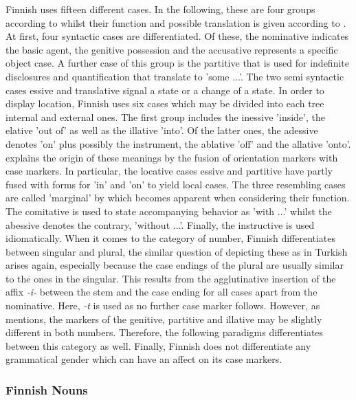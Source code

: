 \documentclass[11pt,a4paper,twoside,openright]{scrbook}
\begin{document}
Finnish uses fifteen different cases. In the following, these are four groups according to \citet{putz2002finn} whilst their function and possible translation is given according to \citet{karlsson2018finn}. At first, four syntactic cases are differentiated. Of these, the nominative indicates the basic agent, the genitive possession and the accusative represents a specific object case. A further case of this group is the partitive that is used for indefinite disclosures and quantification that translate to 'some ...'. The two semi syntactic cases essive and translative signal a state or a change of a state. In order to display location, Finnish uses six cases which may be divided into each tree internal and external ones. The first group includes the inessive 'inside', the elative 'out of' as well as the illative 'into'. Of the latter ones, the adessive denotes 'on' plus possibly the instrument, the ablative 'off' and the allative 'onto'. \citet{blake2012hbocas} explains the origin of these meanings by the fusion of orientation markers with case markers. In particular, the locative cases essive and partitive have partly fused with forms for 'in' and 'on' to yield  local cases. The three resembling cases are called 'marginal' by \citet{putz2002finn} which becomes apparent when considering their function. The comitative is used to state accompanying behavior as 'with ...' whilst the abessive denotes the contrary, 'without ...'. Finally, the instructive is used idiomatically. When it comes to the category of number, Finnish differentiates between singular and plural, the similar question of depicting these as in Turkish arises again, especially because the case endings of the plural are usually similar to the ones in the singular. This results from the agglutinative insertion of the affix \textit{-i-} between the stem and the case ending for all cases apart from the nominative. Here, \textit{-t} is used as no further case marker follows. However, as \citet{white2008finn} mentions, the markers of the genitive, partitive and illative may be slightly different in both numbers. Therefore, the following paradigms differentiates between this category as well. Finally, Finnish does not differentiate any grammatical gender which can have an affect on its case markers. 




\subsubsection{Finnish Nouns}
\end{document}
